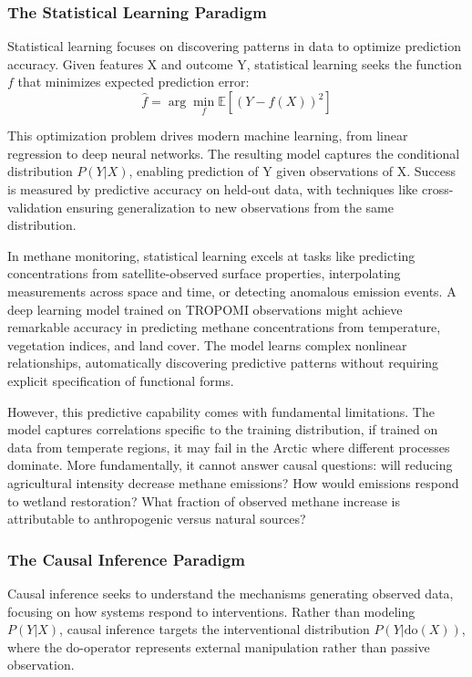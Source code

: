 \subsubsection{The Statistical Learning Paradigm}

Statistical learning focuses on discovering patterns in data to optimize prediction accuracy. Given features X and outcome Y, statistical learning seeks the function $f$ that minimizes expected prediction error:
\begin{equation}
\hat{f} = \arg\min_f \mathbb{E}[(Y - f(X))^2]
\end{equation}

This optimization problem drives modern machine learning, from linear regression to deep neural networks. The resulting model captures the conditional distribution $P(Y|X)$, enabling prediction of Y given observations of X. Success is measured by predictive accuracy on held-out data, with techniques like cross-validation ensuring generalization to new observations from the same distribution.

In methane monitoring, statistical learning excels at tasks like predicting concentrations from satellite-observed surface properties, interpolating measurements across space and time, or detecting anomalous emission events. A deep learning model trained on TROPOMI observations might achieve remarkable accuracy in predicting methane concentrations from temperature, vegetation indices, and land cover. The model learns complex nonlinear relationships, automatically discovering predictive patterns without requiring explicit specification of functional forms.

However, this predictive capability comes with fundamental limitations. The model captures correlations specific to the training distribution, if trained on data from temperate regions, it may fail in the Arctic where different processes dominate. More fundamentally, it cannot answer causal questions: will reducing agricultural intensity decrease methane emissions? How would emissions respond to wetland restoration? What fraction of observed methane increase is attributable to anthropogenic versus natural sources?

\subsubsection{The Causal Inference Paradigm}

Causal inference seeks to understand the mechanisms generating observed data, focusing on how systems respond to interventions. Rather than modeling $P(Y|X)$, causal inference targets the interventional distribution $P(Y|\text{do}(X))$, where the do-operator represents external manipulation rather than passive observation.

